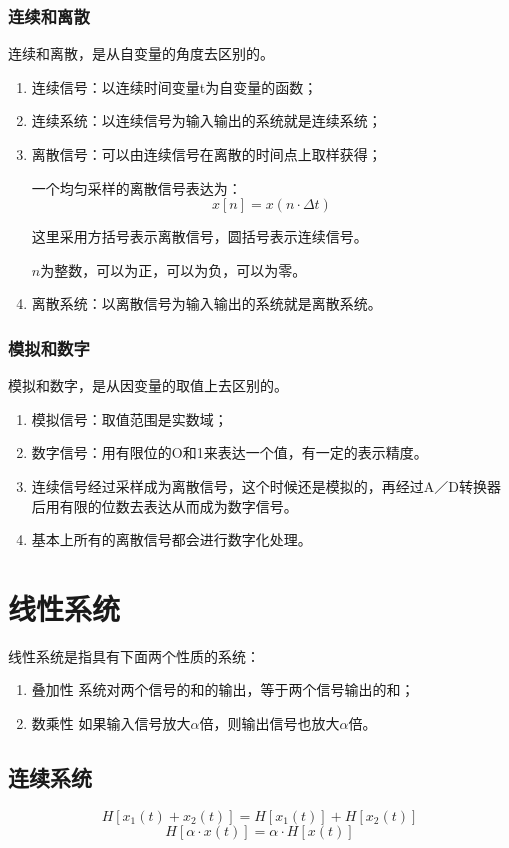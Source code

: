 \subsubsection{连续和离散}
连续和离散，是从自变量的角度去区别的。
\begin{enumerate}
	\item 连续信号：以连续时间变量t为自变量的函数；
	\item 连续系统：以连续信号为输入输出的系统就是连续系统；
	\item 离散信号：可以由连续信号在离散的时间点上取样获得；

	      一个均匀采样的离散信号表达为：
	      \begin{equation}
		      x[n]=x(n\cdot \Delta t)
	      \end{equation}

	      这里采用方括号表示离散信号，圆括号表示连续信号。

	      $n$为整数，可以为正，可以为负，可以为零。
	\item 离散系统：以离散信号为输入输出的系统就是离散系统。
\end{enumerate}
\subsubsection{模拟和数字}
模拟和数字，是从因变量的取值上去区别的。
\begin{enumerate}
	\item 模拟信号：取值范围是实数域；
	\item 数字信号：用有限位的O和1来表达一个值，有一定的表示精度。
	\item 连续信号经过采样成为离散信号，这个时候还是模拟的，再经过A／D转换器后用有限的位数去表达从而成为数字信号。
	\item 基本上所有的离散信号都会进行数字化处理。
\end{enumerate}
\section{线性系统}
线性系统是指具有下面两个性质的系统：
\begin{enumerate}
	\item 叠加性
	      系统对两个信号的和的输出，等于两个信号输出的和；
	\item 数乘性
	      如果输入信号放大$\alpha$倍，则输出信号也放大$\alpha$倍。
\end{enumerate}
\subsection{连续系统}
\begin{equation}
	H[x_1(t)+x_2(t)]=H[x_1(t)]+H[x_2(t)]
\end{equation}
\begin{equation}
	H[\alpha\cdot x(t)]=\alpha\cdot H[x(t)]
\end{equation}
